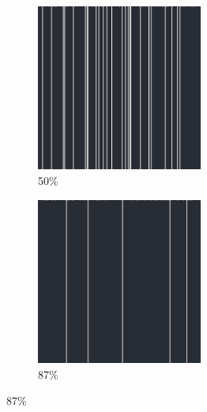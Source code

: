 \documentclass[12pt, fleqn]{report}                             %
\theoremstyle{break}                                            %
\begin{document}
\begin{figure}[ht!]
\begin{subfigure}[b]{0.4\linewidth}
          \includegraphics[width=0.6\textwidth]{Images/72/c.png}
          \caption{50\%}
        \end{subfigure}
        \begin{subfigure}[b]{0.4\linewidth}
          \includegraphics[width=0.6\textwidth]{Images/72/d.png}
          \caption{87\%}
        \end{subfigure}
      \end{figure}
\end{document}

